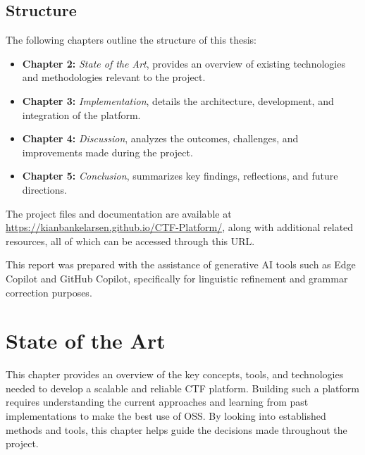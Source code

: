 \section{Structure} 
The following chapters outline the structure of this thesis:
\begin{itemize}
    \item \textbf{Chapter 2:} \textit{State of the Art}, provides an overview of existing technologies and methodologies relevant to the project.
    \item \textbf{Chapter 3:} \textit{Implementation}, details the architecture, development, and integration of the platform.
    \item \textbf{Chapter 4:} \textit{Discussion}, analyzes the outcomes, challenges, and improvements made during the project.
    \item \textbf{Chapter 5:} \textit{Conclusion}, summarizes key findings, reflections, and future directions.
\end{itemize}

The project files and documentation are available at \url{https://kianbankelarsen.github.io/CTF-Platform/}, along with additional related resources, all of which can be accessed through this URL.

This report was prepared with the assistance of generative AI tools such as Edge Copilot and GitHub Copilot, specifically for linguistic refinement and grammar correction purposes.


%     


\chapter{State of the Art}

This chapter provides an overview of the key concepts, tools, and technologies needed to develop a scalable and reliable CTF platform. Building such a platform requires understanding the current approaches and learning from past implementations to make the best use of OSS. By looking into established methods and tools, this chapter helps guide the decisions made throughout the project.

